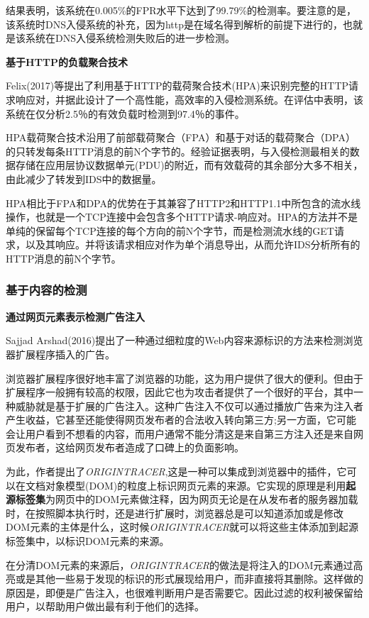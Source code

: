 \documentclass[12pt]{article} %
\begin{document}
结果表明，该系统在0.005\%的FPR水平下达到了99.79\%的检测率。要注意的是，该系统时DNS入侵系统的补充，因为http是在域名得到解析的前提下进行的，也就是该系统在DNS入侵系统检测失败后的进一步检测。

\textbf{基于HTTP的负载聚合技术}

Felix(2017)\cite{Felix}等提出了利用基于HTTP的载荷聚合技术(HPA)来识别完整的HTTP请求响应对，并据此设计了一个高性能，高效率的入侵检测系统。在评估中表明，该系统在仅分析2.5％的有效负载时检测到97.4％的事件。

HPA载荷聚合技术沿用了前部载荷聚合（FPA）和基于对话的载荷聚合（DPA）的只转发每条HTTP消息的前N个字节的。经验证据表明，与入侵检测最相关的数据存储在应用层协议数据单元(PDU)的附近，而有效载荷的其余部分大多不相关，由此减少了转发到IDS中的数据量。

HPA相比于FPA和DPA的优势在于其兼容了HTTP2和HTTP1.1中所包含的流水线操作，也就是一个TCP连接中会包含多个HTTP请求-响应对。HPA的方法并不是单纯的保留每个TCP连接的每个方向的前N个字节，而是检测流水线的GET请求，以及其响应。并将该请求相应对作为单个消息导出，从而允许IDS分析所有的HTTP消息的前N个字节。

\subsubsection{基于内容的检测}

\label{content}

\textbf{通过网页元素表示检测广告注入}

Sajjad Arshad(2016)\cite{Arshad}提出了一种通过细粒度的Web内容来源标识的方法来检测浏览器扩展程序插入的广告。

浏览器扩展程序很好地丰富了浏览器的功能，这为用户提供了很大的便利。但由于扩展程序一般拥有较高的权限，因此它也为攻击者提供了一个很好的平台，其中一种威胁就是基于扩展的广告注入。这种广告注入不仅可以通过播放广告来为注入者产生收益，它甚至还能使得网页发布者的合法收入转向第三方;另一方面，它可能会让用户看到不想看的内容，而用户通常不能分清这是来自第三方注入还是来自网页发布者，这给网页发布者造成了口碑上的负面影响。 %

为此，作者提出了\emph{ORIGINTRACER},这是一种可以集成到浏览器中的插件，它可以在文档对象模型(DOM)的粒度上标识网页元素的来源。它实现的原理是利用\textbf{起源标签集}为网页中的DOM元素做注释，因为网页无论是在从发布者的服务器加载时，在按照脚本执行时，还是进行扩展时，浏览器总是可以知道添加或是修改DOM元素的主体是什么，这时候\emph{ORIGINTRACER}就可以将这些主体添加到起源标签集中，以标识DOM元素的来源。

在分清DOM元素的来源后，\emph{ORIGINTRACER}的做法是将注入的DOM元素通过高亮或是其他一些易于发现的标识的形式展现给用户，而非直接将其删除。这样做的原因是，即便是广告注入，也很难判断用户是否需要它。因此过滤的权利被保留给用户，以帮助用户做出最有利于他们的选择。
\end{document}
